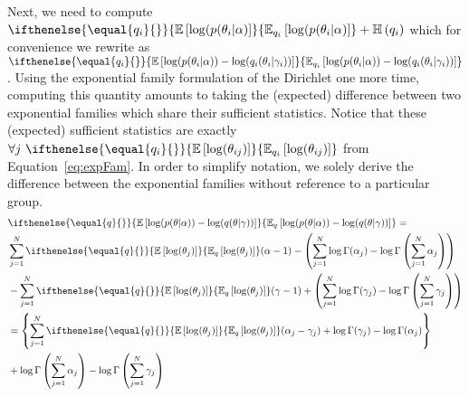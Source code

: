 \documentclass[a4paper, 11pt]{article}
\newcommand{\E}[2][]{
\ifthenelse{\equal{#1}{}}{\mathbb{E}\left[ #2 \right]}{\mathbb{E}_{#1}\left[ #2 \right]}
}
\newcommand{\Ent}[1]{\mathbb{H}\left( #1 \right)}
\begin{document}
Next, we need to compute $ \E[q_{i}]{\log(p(\theta_{i}|\alpha)} + \Ent{q_{i}} $ which for convenience we rewrite as 
$ \E[q_{i}]{\log(p(\theta_{i}|\alpha)) - \log(q_{i}(\theta_{i}|\gamma_{i}))} $. Using the exponential family formulation of the Dirichlet one more time, computing this
quantity amounts to taking the (expected) difference between two exponential families which share their sufficient statistics. 
Notice that these (expected) sufficient statistics 
are exactly $ \forall j \ \E[q_{i}]{\log(\theta_{ij})} $ from Equation~\eqref{eq:expFam}. In order to simplify notation, we solely derive the difference between
the exponential families without reference to a particular group.
\begin{equation}
\begin{aligned}
&\E[q]{\log(p(\theta|\alpha)) - \log(q(\theta|\gamma))} = \\
&\sum_{j=1}^{N}\E[q]{\log(\theta_{j})} (\alpha-1) - \left(\sum_{j=1}^{N}\log\Gamma(\alpha_{j}) - \log\Gamma\left(\sum_{j=1}^{N}\alpha_{j}\right)\right) \\
&- \sum_{j=1}^{N}\E[q]{\log(\theta_{j})} (\gamma-1) + \left(\sum_{j=1}^{N}\log\Gamma(\gamma_{j}) - \log\Gamma\left(\sum_{j=1}^{N}\gamma_{j}\right)\right) \\
&= \left\{\sum_{j=1}^{N} \E[q]{\log(\theta_{j})} (\alpha_{j} - \gamma_{j}) + \log\Gamma(\gamma_{j}) - \log\Gamma(\alpha_{j})\right\} \\
&+ \log\Gamma\left(\sum_{j=1}^{N} \alpha_{j}\right) - \log\Gamma\left(\sum_{j=1}^{N} \gamma_{j}\right)
\end{aligned}
\end{equation} 


\end{document}
